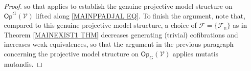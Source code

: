 \documentclass[a4paper,10pt
,draft
]{article}%
\numberwithin{equation}{section}
\numberwithin{figure}{section}
\theoremstyle{definition} %
\newtheorem{definition}[equation]{Definition}%
\newcommand{\F}{\ensuremath{\mathcal F}}
\newcommand{\V}{\ensuremath{\mathcal V}}
\newcommand{\1}{\ensuremath{\mathbbm 1}}%
\begin{document}
\begin{proof}
so that \cite[Thm. 11.3.2(2)]{Hi03}
applies to establish the 
genuine projective model structure on 
$\mathsf{Op}^G(\mathcal{V})$
lifted along \eqref{MAINPFADJAL EQ}.
To finish the argument,
note that, compared to this genuine projective model structure,
a choice of 
$\mathcal{F} = \{\mathcal{F}_n\}$
as in Theorem \ref{MAINEXIST1 THM}
decreases generating (trivial) cofibrations and
increases weak equivalences,
so that the argument
in the previous paragraph concerning the
projective model structure on
$\mathsf{Op}_{G}(\mathcal{V})$
applies mutatis mutandis.
%
\end{proof}









\end{document}
